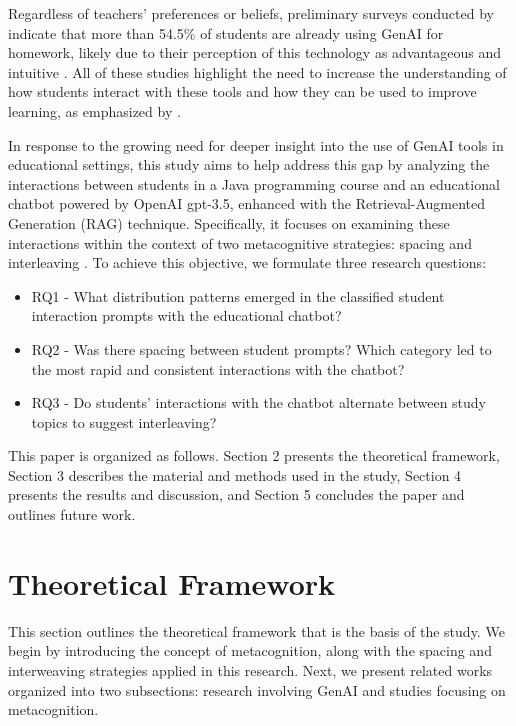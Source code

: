 \documentclass[sn-apa]{sn-jnl} %
\begin{document}
Regardless of teachers' preferences or beliefs, preliminary surveys conducted
by \cite{Dickey24} indicate that more than 54.5\% of students are already using
GenAI for homework, likely due to their perception of this technology as
advantageous and intuitive \citep{Boudouaia24}. All of these studies highlight
the need to increase the understanding of how students interact with these tools
and how they can be used to improve learning, as emphasized by \cite{Lo24}.

In response to the growing need for deeper insight into the use of GenAI tools
in educational settings, this study aims to help address this gap by analyzing
the interactions between students in a Java programming course and an
educational chatbot powered by OpenAI gpt-3.5, enhanced with the
Retrieval-Augmented Generation (RAG) technique. Specifically, it focuses on
examining these interactions within the context of two metacognitive strategies:
spacing \citep{Carvalho20} and interleaving \citep{Rivers21}. To achieve this
objective, we formulate three research questions:

\begin{itemize}
    \item RQ1 - What distribution patterns emerged in the classified student
    interaction prompts with the educational chatbot?
    \item RQ2 - Was there spacing between student prompts? Which category led to
    the most rapid and consistent interactions with the chatbot?
    \item RQ3 - Do students' interactions with the chatbot alternate between study
    topics to suggest interleaving?
  \end{itemize}

This paper is organized as follows. Section 2 presents the theoretical
framework, Section 3 describes the material and methods used in the study,
Section 4 presents the results and discussion, and Section 5 concludes the
paper and outlines future work.

\section{Theoretical Framework}\label{sec1}

This section outlines the theoretical framework that is the basis of the study.
We begin by introducing the concept of metacognition, along with the spacing and
interweaving strategies applied in this research. Next, we present related works
organized into two subsections: research involving GenAI and studies focusing
on metacognition.
\end{document}
